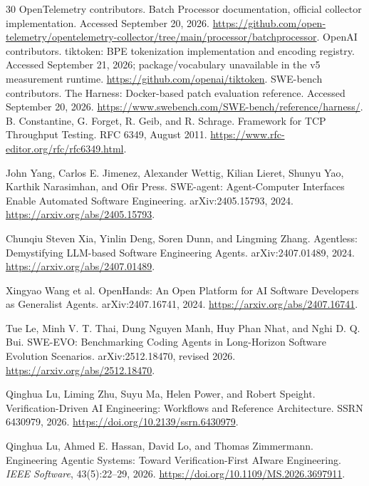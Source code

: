 \begin{thebibliography}{30}
 OpenTelemetry contributors.
\newblock Batch Processor documentation, official collector implementation.
\newblock Accessed September 20, 2026.
\newblock \url{https://github.com/open-telemetry/opentelemetry-collector/tree/main/processor/batchprocessor}.
 OpenAI contributors.
\newblock tiktoken: BPE tokenization implementation and encoding registry.
\newblock Accessed September 21, 2026; package/vocabulary unavailable in the v5 measurement runtime.
\newblock \url{https://github.com/openai/tiktoken}.
 SWE-bench contributors.
\newblock The Harness: Docker-based patch evaluation reference.
\newblock Accessed September 20, 2026.
\newblock \url{https://www.swebench.com/SWE-bench/reference/harness/}.
 B. Constantine, G. Forget, R. Geib, and R. Schrage.
\newblock Framework for TCP Throughput Testing. RFC 6349, August 2011.
\newblock \url{https://www.rfc-editor.org/rfc/rfc6349.html}.

 John Yang, Carlos E. Jimenez, Alexander Wettig, Kilian Lieret, Shunyu Yao, Karthik Narasimhan, and Ofir Press.
\newblock SWE-agent: Agent-Computer Interfaces Enable Automated Software Engineering.
\newblock arXiv:2405.15793, 2024.
\newblock \url{https://arxiv.org/abs/2405.15793}.

 Chunqiu Steven Xia, Yinlin Deng, Soren Dunn, and Lingming Zhang.
\newblock Agentless: Demystifying LLM-based Software Engineering Agents.
\newblock arXiv:2407.01489, 2024.
\newblock \url{https://arxiv.org/abs/2407.01489}.

 Xingyao Wang et al.
\newblock OpenHands: An Open Platform for AI Software Developers as Generalist Agents.
\newblock arXiv:2407.16741, 2024.
\newblock \url{https://arxiv.org/abs/2407.16741}.

 Tue Le, Minh V. T. Thai, Dung Nguyen Manh, Huy Phan Nhat, and Nghi D. Q. Bui.
\newblock SWE-EVO: Benchmarking Coding Agents in Long-Horizon Software Evolution Scenarios.
\newblock arXiv:2512.18470, revised 2026.
\newblock \url{https://arxiv.org/abs/2512.18470}.

 Qinghua Lu, Liming Zhu, Suyu Ma, Helen Power, and Robert Speight.
\newblock Verification-Driven AI Engineering: Workflows and Reference Architecture.
\newblock SSRN 6430979, 2026.
\newblock \url{https://doi.org/10.2139/ssrn.6430979}.

 Qinghua Lu, Ahmed E. Hassan, David Lo, and Thomas Zimmermann.
\newblock Engineering Agentic Systems: Toward Verification-First AIware Engineering.
\newblock \emph{IEEE Software}, 43(5):22--29, 2026.
\newblock \url{https://doi.org/10.1109/MS.2026.3697911}.


\end{thebibliography}
